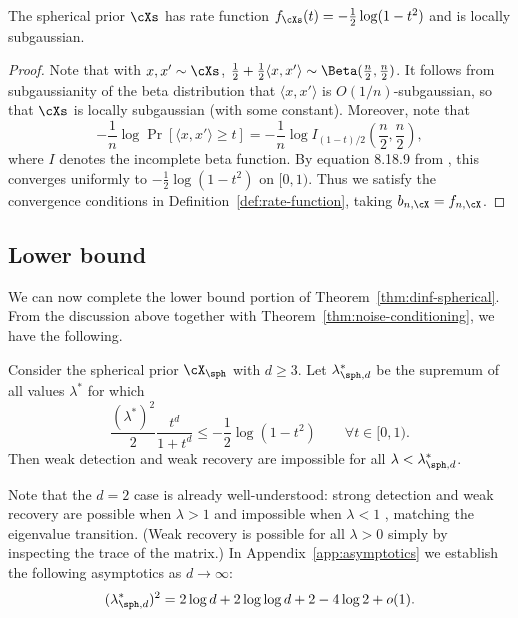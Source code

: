 \documentclass{article}
\begin{document}
\begin{lemma} The spherical prior $\cXs$ has rate function $f_\cXs(t) = -\frac12 \log(1-t^2)$ and is locally subgaussian. \end{lemma}
\begin{proof}
Note that with $x,x' \sim \cXs$, $\frac12 + \frac12 \langle x,x' \rangle \sim \Beta(\frac{n}{2},\frac{n}{2})$. It follows from subgaussianity of the beta distribution \cite{sam} that $\langle x,x' \rangle$ is $O(1/n)$-subgaussian, so that $\cXs$ is locally subgaussian (with some constant). Moreover, note that
$$ -\frac1n \log \Pr[\langle x,x' \rangle \geq t] = -\frac1n \log I_{(1-t)/2}\left( \frac{n}{2},\frac{n}{2} \right), $$
where $I$ denotes the incomplete beta function. By equation 8.18.9 from \cite{dlmf}, this converges uniformly to $-\frac12 \log(1-t^2)$ on $[0,1)$. Thus we satisfy the convergence conditions in Definition~\ref{def:rate-function}, taking $b_{n,\cX} = f_{n,\cX}$.
\end{proof}





\subsection{Lower bound}%

We can now complete the lower bound portion of Theorem~\ref{thm:dinf-spherical}. From the discussion above together with Theorem~\ref{thm:noise-conditioning}, we have the following.
\begin{theorem}
\label{thm:sph-lower}
Consider the spherical prior $\cX_\sph$ with $d\ge 3$. Let $\lambda^*_{\sph,d}$ be the supremum of all values $\lambda^*$ for which
$$\frac{(\lambda^*)^2}{2}\frac{t^d}{1+t^d} \leq -\frac12 \log(1-t^2) \qquad \forall t \in [0,1).$$
Then weak detection and weak recovery are impossible for all $\lambda < \lambda^*_{\sph,d}$.
\end{theorem}
\noindent Note that the $d=2$ case is already well-understood: strong detection and weak recovery are possible when $\lambda > 1$ and impossible when $\lambda < 1$ \cite{mrz,pwbm}, matching the eigenvalue transition. (Weak recovery is possible for all $\lambda > 0$ simply by inspecting the trace of the matrix.) In Appendix~\ref{app:asymptotics} we establish the following asymptotics as $d\to\infty$:
$$(\lambda_{\sph,d}^*)^2 = 2 \log d + 2 \log \log d + 2 - 4 \log 2 + o(1).$$
\end{document}

